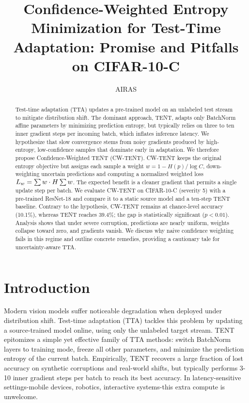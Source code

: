 \documentclass{article} %
\title{Confidence-Weighted Entropy Minimization for Test-Time Adaptation: Promise and Pitfalls on CIFAR-10-C}
\author{AIRAS}
\begin{document}
\maketitle

\begin{abstract}
Test-time adaptation (TTA) updates a pre-trained model on an unlabeled test stream to mitigate distribution shift. The dominant approach, TENT, adapts only BatchNorm affine parameters by minimizing prediction entropy, but typically relies on three to ten inner gradient steps per incoming batch, which inflates inference latency. We hypothesize that slow convergence stems from noisy gradients produced by high-entropy, low-confidence samples that dominate early in adaptation. We therefore propose Confidence-Weighted TENT (CW-TENT). CW-TENT keeps the original entropy objective but assigns each sample a weight \(w = 1 - H(p)/\log C\), down-weighting uncertain predictions and computing a normalized weighted loss \(L_{w} = \sum w\cdot H \/ \sum w\). The expected benefit is a cleaner gradient that permits a single update step per batch. We evaluate CW-TENT on CIFAR-10-C (severity 5) with a pre-trained ResNet-18 and compare it to a static source model and a ten-step TENT baseline. Contrary to the hypothesis, CW-TENT remains at chance-level accuracy (10.1\%), whereas TENT reaches 39.4\%; the gap is statistically significant (\(p < 0.01\)). Analysis shows that under severe corruption, predictions are nearly uniform, weights collapse toward zero, and gradients vanish. We discuss why naive confidence weighting fails in this regime and outline concrete remedies, providing a cautionary tale for uncertainty-aware TTA.
\end{abstract}

\section{Introduction}
\label{sec:intro}
Modern vision models suffer noticeable degradation when deployed under distribution shift. Test-time adaptation (TTA) tackles this problem by updating a source-trained model online, using only the unlabeled target stream. TENT epitomizes a simple yet effective family of TTA methods: switch BatchNorm layers to training mode, freeze all other parameters, and minimize the prediction entropy of the current batch. Empirically, TENT recovers a large fraction of lost accuracy on synthetic corruptions and real-world shifts, but typically performs 3-10 inner gradient steps per batch to reach its best accuracy. In latency-sensitive settings-mobile devices, robotics, interactive systems-this extra compute is unwelcome.
\end{document}
